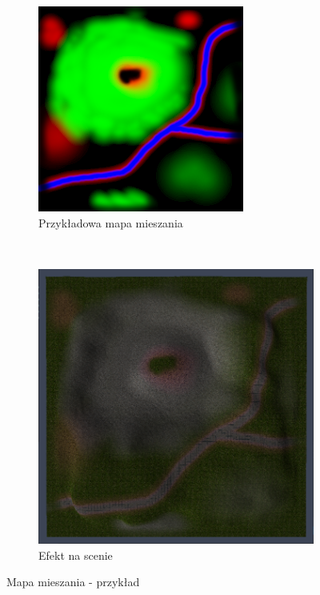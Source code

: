 \documentclass[a4paper,twoside,12pt]{book}
\begin{document}
\begin{figure}[H]
    \centering
    \begin{subfigure}[b]{0.475\textwidth}
        \includegraphics[width=\textwidth]{res/blend_map.png}
        \caption{Przykładowa mapa mieszania}
        \label{fig:blend_map}
    \end{subfigure}
    ~ %
    \begin{subfigure}[b]{0.475\textwidth}
        \includegraphics[width=\textwidth]{res/terrain_blend.png}
        \caption{Efekt na scenie}
        \label{fig:terrain_blend}
    \end{subfigure}
    \caption{Mapa mieszania - przykład}
    \label{fig:blend_example}
\end{figure}
\end{document}
